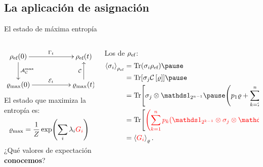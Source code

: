 \subsection{La aplicación de asignación}
\begin{frame}{El estado de máxima entropía}
    \begin{columns}
        \begin{column}{0.5\textwidth}
            \begin{displaymath}
                \xymatrix{
                  {\rho_{\ef}(0)} \ar[rr]^{\Gamma_{t}} \ar[d]^{\mcA_{\mcC}^{\max}}
                  && {\rho_{\ef}(t)}\\
                  {\varrho_{\max}(0)} \ar[rr]^{\mcE_{t}}
                  && {\varrho_{\max}(t)} \ar[u]^{\mcC}
                }
              \end{displaymath}\pause
              El estado que maximiza la entropía es:
              \begin{equation}
                  \varrho_{\max}=\frac{1}{Z}\exp(\sum_{i}\lambda_{i}{\color{red}G_{i}})\nonumber
              \end{equation}\pause
              ¿Qué valores de expectación \textbf{conocemos}?
        \end{column}
        \pause
        \begin{column}{0.5\textwidth}
            Los de $\rho_{\text{ef}}$\pause:
            \begin{align}
                \expval{\pauli{i}}_{\rho_{\ef}}&=\Tr(\pauli{i}\rho_{\ef})\pause\nonumber\\
                &=\Tr[\sigma_{j}\CG{\varrho}]\pause\nonumber\\
                &=\Tr[\sigma_{j}\otimes\Id_{2^{n-1}}\pause\qty(p_{1}\varrho+\sum_{k=2}^{n}p_{k}S_{1,k}\varrho S_{1,k})]\pause\nonumber\\
                &=\Tr[{\color{red}\qty(\sum_{k=1}^{n}p_{k}(\Id_{2^{k-1}}\otimes\sigma_{j}\otimes\Id_{2^{n-k}}))}\varrho]\pause\nonumber\\
                &=\expval{{\color{red}G_{i}}}_{\varrho}.\nonumber
            \end{align}
        \end{column}
    \end{columns}
\end{frame}
